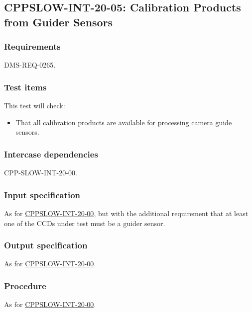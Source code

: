 \subsection{CPPSLOW-INT-20-05: Calibration Products from Guider Sensors}
\label{cppslow-int-20-05}

\subsubsection{Requirements}

DMS-REQ-0265.

\subsubsection{Test items}

This test will check:

\begin{itemize}

  \item{That all calibration products are available for processing camera
  guide sensors.}

\end{itemize}

\subsubsection{Intercase dependencies}

CPP-SLOW-INT-20-00.

\subsubsection{Input specification}

As for \hyperref[cppslow-int-20-00]{CPPSLOW-INT-20-00}, but with the
additional requirement that at least one of the CCDs under test must be a
guider sensor.

\subsubsection{Output specification}

As for \hyperref[cppslow-int-20-00]{CPPSLOW-INT-20-00}.

\subsubsection{Procedure}

As for \hyperref[cppslow-int-20-00]{CPPSLOW-INT-20-00}.
